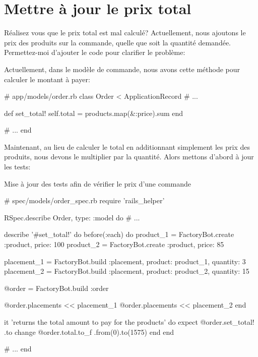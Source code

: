 \documentclass[]{report}
\begin{document}
  \section{Mettre à jour le prix total}

    Réalisez vous que le prix total est mal calculé?  Actuellement, nous ajoutons le prix des produits sur la commande, quelle que soit la quantité demandée. Permettez-moi d'ajouter le code pour clarifier le problème:

    Actuellement, dans le modèle de commande, nous avons cette méthode pour calculer le montant à payer:

    \begin{listing}
      \begin{rubycode}
      # app/models/order.rb
      class Order < ApplicationRecord
        # ...

        def set_total!
          self.total = products.map(&:price).sum
        end

        # ...
      end
      \end{rubycode}
    \end{listing}

    Maintenant, au lieu de calculer le total en additionnant simplement les prix des produits, nous devons le multiplier par la quantité. Alors mettons d'abord à jour les tests:

    \begin{listing}
      \caption{Mise à jour des tests afin de vérifier le prix d'une commande}
      \begin{rubycode}
      # spec/models/order_spec.rb
      require 'rails_helper'

      RSpec.describe Order, type: :model do
        # ...

        describe '#set_total!' do
          before(:each) do
            product_1 = FactoryBot.create :product, price: 100
            product_2 = FactoryBot.create :product, price: 85

            placement_1 = FactoryBot.build :placement, product: product_1, quantity: 3
            placement_2 = FactoryBot.build :placement, product: product_2, quantity: 15

            @order = FactoryBot.build :order

            @order.placements << placement_1
            @order.placements << placement_2
          end

          it 'returns the total amount to pay for the products' do
            expect { @order.set_total! }.to change { @order.total.to_f }.from(0).to(1575)
          end
        end

        # ...
      end
      \end{rubycode}
    \end{listing}
\end{document}
